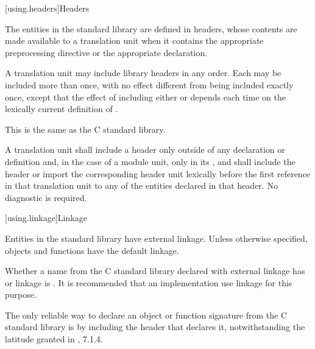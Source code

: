 [using.headers]{Headers}

\pnum
The entities in the \Cpp{} standard library are defined in headers,
whose contents are made available to a translation unit when it contains the appropriate
%
%
preprocessing directive
or the appropriate
%
 declaration.

\pnum
A translation unit may include library headers in any order.
%
Each may be included more than once, with no effect different from
being included exactly once, except that the effect of including either
 or 
depends each time on the lexically current definition of
%
%
.
\begin{footnote}
This is the same as the C standard library.
\end{footnote}

\pnum
A translation unit shall include a header only outside of any
%
declaration or definition and,
in the case of a module unit,
only in its , and
shall include the header or import the corresponding header unit lexically
before the first reference in that translation unit to any of the entities
declared in that header. No diagnostic is required.

[using.linkage]{Linkage}

\pnum
Entities in the \Cpp{} standard library have external linkage.
Unless otherwise specified, objects and functions have the default
linkage.

\pnum
{}%
Whether a name from the C standard library declared with
external linkage has
%
%
%
or
%
linkage is . It is recommended that an
implementation use
linkage for this purpose.
\begin{footnote}
The only reliable way to declare an object or
function signature from the C standard library is by including the header that
declares it, notwithstanding the latitude granted in \IsoC{}, 7.1.4.
\end{footnote}

